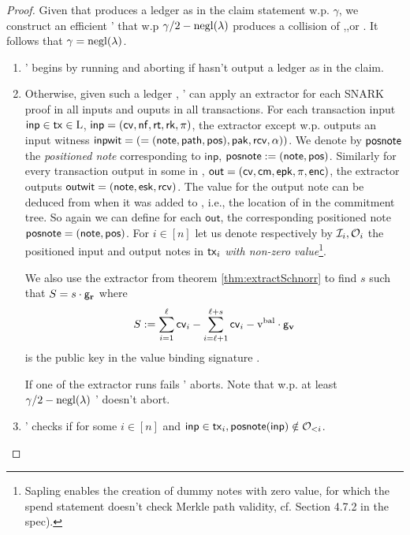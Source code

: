 \documentclass[11pt]{article}
\numberwithin{equation}{section} %
\numberwithin{figure}{section} %
\newcommand{\inp}{\ensuremath{\mathsf{inp}}\xspace}
\newcommand{\out}{\ensuremath{\mathsf{out}}\xspace}
\begin{document}
 \begin{proof}
 Given \adv that produces a ledger as in the claim statement w.p. $\gamma$, we construct an efficient \adv' that
 w.p $\gamma/2-\mathrm{negl}(\lambda)$ produces a collision of \IVK,\notecom,\treehash or \valcom.
 It follows that $\gamma =\mathrm{negl}(\lambda)$.
\begin{enumerate}
\item \adv' begins by running \adv and aborting if \adv hasn't output a ledger as in the claim.
\item Otherwise, given such a ledger \ledger, \adv' can apply an extractor for each SNARK proof in all inputs and ouputs in all transactions.
 For each transaction input $\inp\in \tx\in \ledger$, $\inp=(\cv,\nf,\rt,\rk,\pi)$, the extractor except w.p. \negl 
 outputs an input witness $\mathsf{inpwit} = (=(\mathsf{note},\mathsf{path},\mathsf{pos}),\mathsf{pak},\mathsf{rcv},\alpha))$.
 We denote by $\mathsf{posnote}$ the \emph{positioned note} corresponding to \inp, $\mathsf{posnote} := (\mathsf{note},\mathsf{pos})$.
 Similarly for every transaction output in some \tx in \ledger, $\out = (\cv,\cm,\epk,\pi,\noteenc)$,
 the extractor outputs $\mathsf{outwit}= (\mathsf{note},\mathsf{esk},\mathsf{rcv})$. The value \pos for the output note can be deduced from when it was added to \ledger,
 i.e., the location of \cm in the commitment tree.
 So again we can define for each \out, the corresponding positioned note $\mathsf{posnote} = (\mathsf{note},\mathsf{pos})$.
For $i\in [n]$ let us denote respectively by ${\mathcal{I}}_i,{\mathcal{O}}_i$ the positioned input and output notes in $\mathsf{tx}_i$ \emph{with non-zero value}\footnote{Sapling enables the creation of dummy notes with zero value, for which the spend statement doesn't check Merkle path validity, cf. Section 4.7.2 in the spec).}.


We also use the extractor from theorem \ref{thm:extractSchnorr} to find $s$ such that $S=s\cdot \mathsf{g}_\mathbf{r}$
where
\[S:=\sum_{i=1}^\ell \mathsf{cv}_i - \sum_{i=\ell+1}^{\ell+s}\mathsf{cv}_i-\mathrm{v^{bal}}\cdot \mathsf{g}_{\mathbf{v}}\]
is the public key in the value binding signature \sigval.

If one of the extractor runs fails \adv' aborts. Note that w.p. at least $\gamma/2 -\mathrm{negl}(\lambda)$ \adv' doesn't abort.

\item  \adv' checks if for some $i\in [n]$ and $\inp\in \tx_i, \posnote(\inp)\notin \outnotes_{<i}$.


\end{enumerate}
\end{proof}
\end{document}
